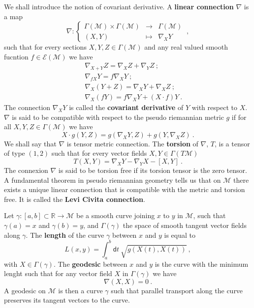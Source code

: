 \documentclass[10pt]{book}
\let\int\int
\newcommand{\Ecal}{\mathcal{E}}
\newcommand{\Mcal}{\mathcal{M}}
\newcommand{\Rbb}{\mathbb{R}}
\newcommand{\dsf}{\mathsf{d}}
\theoremstyle{break}
\begin{document}
We shall introduce the notion of covariant derivative. A \textbf{linear connection} $\nabla$ is a map 
%
\begin{equation*}
\nabla : \left\{
\begin{array}{ccl}
\Gamma(\Mcal) \times \Gamma(\Mcal) & \to & \Gamma(\Mcal) \\
(X,Y) & \mapsto & \nabla_X Y 
\end{array}
\right. \ ,
\end{equation*}
%
such that for every sections $X, Y, Z \in \Gamma(\Mcal)$ and any real valued smooth fucntion $f \in \Ecal(\Mcal)$ we have
%
\begin{eqnarray*}
&& \nabla_{X + Y} Z = \nabla_X Z + \nabla_Y Z \ ; \\ 
&& \nabla_{f X} Y = f \nabla_X Y \ ;\\
&& \nabla_X(Y+Z) = \nabla_X Y + \nabla_X Z \ ;\\
&& \nabla_X(fY) = f \nabla_X Y + (X \cdot f) Y \ .
\end{eqnarray*}
%
The connection $\nabla_X Y$ is called the \textbf{covariant derivative} of $Y$ with respect to $X$. $\nabla$ is said to be compatible with respect to the pseudo riemannian metric $g$ if for all $X, Y, Z \in \Gamma(\Mcal)$ we have
%
\begin{equation*}
X \cdot g(Y,Z) = g(\nabla_X Y, Z) + g(Y,\nabla_X Z) \ .
\end{equation*}
%
We shall say that $\nabla$ is tensor metric connection. The \textbf{torsion} of $\nabla$, $T$, is a tensor of type $(1,2)$ such that for every vector fields $X, Y \in \Gamma(T\Mcal)$ 
%
\begin{equation*}
T(X,Y) = \nabla_X Y - \nabla_Y X - \left[ X,Y\right] \ .
\end{equation*}
%
The connexion $\nabla$ is said to be torsion free if its torsion tensor is the zero tensor. A fundamental theorem in pseudo riemannian geometry tells us that on $\Mcal$ there exists a unique linear connection that is compatible with the metric and torsion free. It is called the \textbf{Levi Civita connection}.


\bigskip


Let $\gamma : [a,b] \subset \Rbb \to \Mcal$ be a smooth curve joining $x$ to $y$ in $\Mcal$, such that $\gamma(a)=x$ and $\gamma(b)=y$, and $\Gamma(\gamma)$ the space of smooth tangent vector fields along $\gamma$. The \textbf{length} of the curve $\gamma$ between $x$ and $y$ is equal to
%
\begin{equation*}
L(x,y) = \int_a^b \dsf t \  \sqrt{g\left(X(t),X(t)\right)} \ ,
\end{equation*}
%
with $X \in \Gamma(\gamma)$. The \textbf{geodesic} between $x$ and $y$ is the curve with the minimum lenght such that for any vector field $X$ in $\Gamma(\gamma)$ we have
%
\begin{equation*}
\nabla(X,X) = 0 \ .
\end{equation*}
%
A geodesic on $\Mcal$ is then a curve $\gamma$ such that parallel transport along the curve preserves its tangent vectors to the curve.
\end{document}
